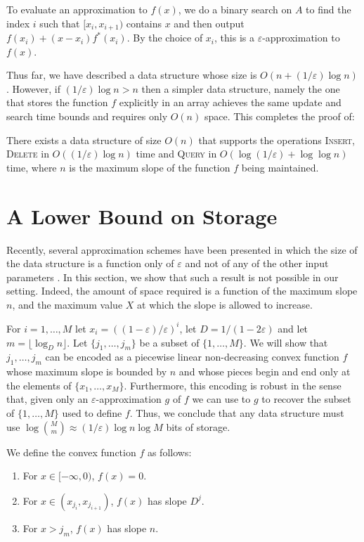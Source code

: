 \documentclass[charterfonts,lotsofwhite]{patmorin}
\newcommand{\eps}{\varepsilon}
\begin{document}
To evaluate an approximation to $f(x)$, we do a binary search on $A$
to find the index $i$ such that $[x_i,x_{i+1})$ contains $x$ and then
output $f(x_i) + (x-x_i)f^*(x_i)$.  By the choice of $x_i$, this is a
$\eps$-approximation to $f(x)$. 

Thus far, we have described a data structure whose size is
$O(n+(1/\eps)\log n)$.  However, if $(1/\eps)\log n > n$ then a
simpler data structure, namely the one that stores the function $f$
explicitly in an array achieves the same update  and search time
bounds and requires only $O(n)$ space.  This completes the proof of:

\begin{thm}
There exists a data structure of size $O(n)$ that supports the
operations \textsc{Insert}, \textsc{Delete} in $O((1/\eps) \log n)$
time and \textsc{Query} in $O(\log (1/\eps) + \log \log n)$ time,
where $n$ is the maximum slope of the function $f$ being maintained.
\end{thm}

\section{A Lower Bound on Storage}

Recently, several approximation schemes have been presented in which
the size of the data structure is a function only of $\eps$ and not of
any of the other input parameters \cite{ah01,i01,k97}.  In this
section, we show that such a result is not possible in our setting.
Indeed, the amount of space required is a function of the maximum
slope $n$, and the maximum value $X$ at which the slope is allowed to
increase.

For $i=1,\ldots,M$ let $x_i=((1-\eps)/\eps)^i$, let $D=1/(1-2\eps)$ and let
$m=\lfloor\log_D n\rfloor$.  Let $\{j_1,\ldots,j_m\}$ be a subset of
$\{1,\ldots,M\}$.  We will show that $j_1,\ldots,j_m$ can be encoded
as a piecewise linear non-decreasing convex function $f$ whose maximum
slope is bounded by $n$ and whose pieces begin and end only at the
elements of $\{x_1,\ldots,x_M\}$.  Furthermore, this encoding is
robust in the sense that, given only an $\eps$-approximation $g$
of $f$ we can use to $g$ to recover the subset of $\{1,\ldots,M\}$
used to define $f$.  Thus, we conclude that any data structure
must use $\log {M\choose m}\approx (1/\eps)\log n\log M$ bits of
storage. 

We define the convex function $f$ as follows:
\begin{enumerate}
\item For $x\in [-\infty,0)$, $f(x)=0$.
\item For $x\in (x_{j_i},x_{j_{i+1}})$, $f(x)$ has slope $D^j$.
\item For $x>j_m$, $f(x)$ has slope $n$.
\end{enumerate}
\end{document}
